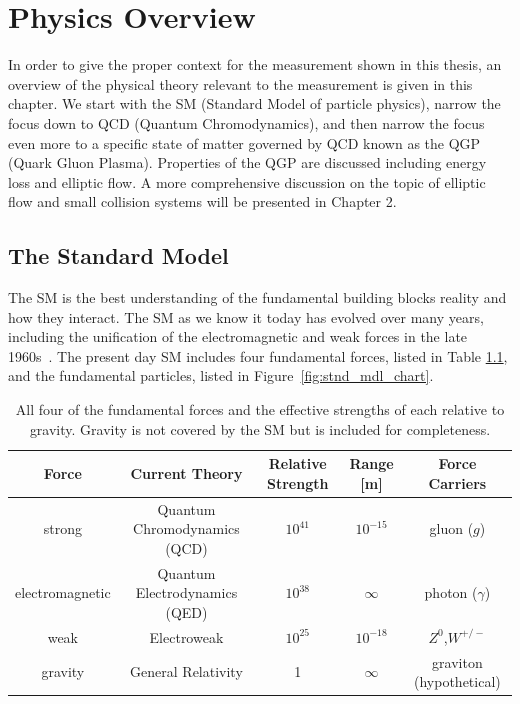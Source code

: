 \chapter{Physics Overview}
In order to give the proper context for the measurement shown in this thesis,  an overview of the physical theory relevant to the measurement is given in this chapter. We start with the SM (Standard Model of particle physics), narrow the focus down to QCD (Quantum Chromodynamics), and then narrow the focus even more to a specific state of matter governed by QCD known as the QGP (Quark Gluon Plasma). Properties of the QGP are discussed including energy loss and elliptic flow. A more comprehensive discussion on the topic of elliptic flow and small collision systems will be presented in Chapter 2.
\section{The Standard Model}
The SM is the best understanding of the fundamental building blocks reality and how they interact. The SM as we know it today has evolved over many years, including the unification of the electromagnetic and weak forces in the late 1960s~\cite{BILENKY198273}. The present day SM includes four fundamental forces, listed in Table \ref{tbl:sm}, and the fundamental particles, listed in Figure~\ref{fig:stnd_mdl_chart}.
\begin{table}[h!]
\caption{All four of the fundamental forces and the effective strengths of each relative to gravity. Gravity is not covered by the SM but is included for completeness.}
\centering
\begin{adjustbox}{width=\textwidth}
    \begin{tabular}{ccccc}
    \hline
    Force &Current Theory  & Relative Strength & Range [m] &  Force Carriers\\ \hline
    strong  & Quantum Chromodynamics (QCD) & $10^{41}$ & $10^{-15}$&  gluon ($g$)\\
    electromagnetic &Quantum Electrodynamics (QED) & $10^{38}$ & $\infty$  &  photon ($\gamma$)\\
    weak & Electroweak & $10^{25}$ &  $10^{-18}$ & $Z^0$,$W^{+/-}$\\
    gravity & General Relativity & 1 & $\infty$ & graviton (hypothetical)\\ \hline
    \end{tabular}
\end{adjustbox}
\label{tbl:sm}
\end{table}

